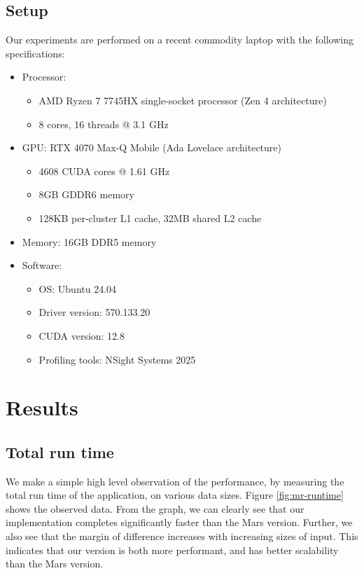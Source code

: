 \documentclass{article}
\begin{document}
\subsection{Setup}
Our experiments are performed on a recent commodity laptop with the following specifications:
\begin{itemize}
    \item Processor: 
    \begin{itemize}
       \item AMD Ryzen 7 7745HX single-socket processor (Zen 4 architecture)
       \item 8 cores, 16 threads @ 3.1 GHz
    \end{itemize}
    \item GPU:  RTX 4070 Max-Q Mobile (Ada Lovelace architecture)
    \begin{itemize}
        \item 4608 CUDA cores @ 1.61 GHz
        \item 8GB GDDR6 memory
        \item 128KB per-cluster L1 cache, 32MB shared L2 cache
    \end{itemize}
    \item Memory: 16GB DDR5 memory
    \item Software:
    \begin{itemize}
        \item OS: Ubuntu 24.04
        \item  Driver version: 570.133.20
        \item CUDA version: 12.8
        \item Profiling tools:  NSight Systems 2025
    \end{itemize}
\end{itemize}

\section{Results}
\subsection{Total run time}
We make a simple high level observation of the performance, by measuring the total run time of the application, on various data sizes. Figure \ref{fig:mr-runtime} shows the observed data. From the graph, we can clearly see that our implementation completes significantly faster than the Mars version. Further, we also see that the margin of difference increases with increasing sizes of input. This indicates that our version is both more performant, and has better scalability than 
the Mars version.
\end{document}
